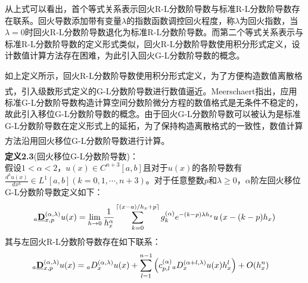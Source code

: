 \documentclass[twoside,UTF8]{nputhesis}
\newcommand{\upcite}[1]{\textsuperscript{\textsuperscript{\cite{#1}}}}
\begin{document}
从上式可以看出，首个等式关系表示回火R-L分数阶导数与标准R-L分数阶导数存在联系。回火导数添加带有变量$\lambda$的指数函数调控回火程度，称$\lambda$为回火指数，当$\lambda =0$时回火R-L分数阶导数退化为标准R-L分数阶导数。而第二个等式关系表示与标准R-L分数阶导数的定义形式类似，回火R-L分数阶导数使用积分形式定义，设计数值计算方法存在困难，为此引入回火G-L分数阶导数的概念。

如上定义所示，回火R-L分数阶导数使用积分形式定义，为了方便构造数值离散格式，引入级数形式定义的G-L分数阶导数进行数值逼近\upcite{li2016high,meerschaert2004finite}。Meerschaert指出\upcite{meerschaert2004finite}，应用标准G-L分数阶导数构造计算空间分数阶微分方程的数值格式是无条件不稳定的，故此引入移位G-L分数阶导数的概念。由于回火G-L分数阶导数可以被认为是标准G-L分数阶导数在定义形式上的延拓，为了保持构造离散格式的一致性，数值计算方法沿用回火移位G-L分数阶导数\upcite{tadjeran2007second}进行计算。\\
\noindent   %
\textbf{定义2.3}(回火移位G-L分数阶导数)\upcite{li2016high,meerschaert2004finite}：
\\
假设$1<\alpha <2$，$u(x)\in {{C}^{n+3}}[a,b]$且对于$u(x)$的各阶导数有$\frac{d^k{u(x)}}{dx^k}\in {{L}^{1}}[a,b](k=0,1,\cdots ,n+3)$。对于任意整数$p$和$\lambda \ge 0$，$\alpha$阶左回火移位G-L分数阶导数定义如下：
\begin{equation}
_{a}\emph{\textbf{D}}_{x,p}^{(\alpha ,\lambda )}u(x)=\lim _{h \rightarrow 0} \frac{1}{h_{x}^{\alpha}} \sum_{k=0}^{\left\lceil(x-a) / h_{x}+p\right\rceil} g_{k}^{(\alpha)} e^{-(k-p) \lambda h_{x}} u\left(x-(k-p) h_{x}\right)
\end{equation}
其与左回火R-L分数阶导数存在如下联系：
\begin{equation}
\begin{split}
&_{a}\emph{\textbf{D}}_{x,p}^{(\alpha ,\lambda )}u(x) ={}_{a}D_{x}^{(\alpha ,\lambda )}u(x)+
\sum\limits_{l=1}^{n-1}{\left( c_{p,l}^{(\alpha)}{}_{a}D_{x}^{(\alpha +l,\lambda )}u(x){h_{x}^{l}} \right)}+O({h_{x}^{n}})
\end{split}
\end{equation}
\end{document}
